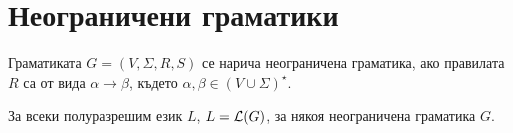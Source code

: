 \section{Неограничени граматики}

\begin{definition}
  Граматиката $G = (V,\Sigma,R,S)$
  се нарича неограничена граматика, 
  ако правилата $R$ са от вида $\alpha \to \beta$,
  където $\alpha,\beta \in (V\cup\Sigma)^\star$.
\end{definition}

\begin{lemma}
  За всеки полуразрешим език $L$, $L = \mathcal{L}(G)$, за някоя неограничена граматика $G$.  
\end{lemma}
